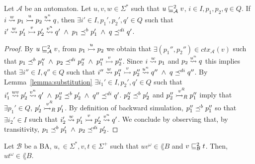 \begin{lemma}
\label{lemma:substf}
Let $\mathcal{A}$ be an automaton.
Let $u,v,w \in \Sigma^*$ such that $u \sqsubseteq_{\mathcal{A}}^{2} v$, $i \in I, p_1,p_2,q \in Q$.
If $i \overset{w}{\rightsquigarrow} p_1 \overset{u}{\rightarrowtail} p_2 \overset{u^n}{\rightsquigarrow} q$,
then $\exists i' \in I, p_1',p_2',q' \in Q$ such that
$i' \overset{w}{\rightsquigarrow} p_1' \overset{v}{\rightarrowtail} p_2' \overset{v^n}{\rightsquigarrow} q' \; \wedge \; p_1 \preceq^b p_1' \; \wedge \; q \preceq^{di} q'$.
\end{lemma}

\begin{proof}
By $u \sqsubseteq_{\mathcal{A}}^{2} v$, from $p_1 \overset{u}{\rightarrowtail} p_2$ we obtain that $\exists (p_1'', p_2'') \in ctx_{\mathcal{A}}(v)$ such that
$p_1 \preceq^b p_1'' \; \wedge \; p_2 \preceq^{di} p_2'' \; \wedge \; p_1'' \overset{v}{\rightarrowtail} p_2''$.
Since $i \overset{w}{\rightsquigarrow} p_1$ and  $p_2 \overset{u^n}{\rightsquigarrow} q$ this implies that $\exists i'' \in I, q'' \in Q$ such that $i'' \overset{w}{\rightsquigarrow} p_1''
\overset{v}{\rightarrowtail} p_2'' \overset{u^n}{\rightsquigarrow} q'' \; \wedge \; q \preceq^{di} q''$.
By Lemma~\ref{lemma:substitution} $\exists i_1' \in I, p_2', q' \in Q$ such that
$i_1' \overset{wv}{\rightsquigarrow} p_2' \overset{v^n}{\rightsquigarrow} q' \; \wedge \; p_2'' \preceq^b p_2' \; \wedge \; q'' \preceq^{di} q'$.
$p_2'' \preceq^b p_2'$ and $p_2'' \overset{v^R}{\rightarrowtail_R} p_1''$ imply that $\exists p_1' \in Q$,
$p_2' \overset{v^R}{\rightarrowtail_R} p_1'$.
By definition of backward simulation, $p_1'' \preceq^b p_1''$ so that
$\exists i_2' \in I$ such that $i_2' \overset{w}{\rightsquigarrow} p_1' \overset{v}{\rightarrowtail} p_2' \overset{v^n}{\rightsquigarrow} q'$.
We conclude by observing that, by transitivity, $p_1 \preceq^b p_1' \; \wedge \; p_2 \preceq^{di} p_2'$.
\end{proof}

\begin{proposition}
\label{proposition:wsdirf-substitution}
Let $\mathcal{B}$ be a BA, $u, \in \Sigma^*, v,t \in \Sigma^+$
such that $uv ^{\omega} \in \lang{B}$ and $v \sqsubseteq_{\mathcal{B}}^{2} t$.
Then, $ut ^{\omega} \in \lang{B}$.
\end{proposition}

